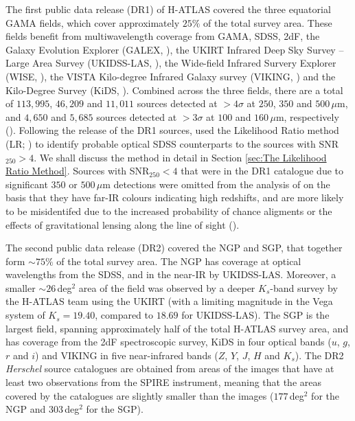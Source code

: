 The first public data release (DR1) of H-ATLAS covered the three equatorial GAMA fields, which cover approximately $25\%$ of the total survey area. These fields benefit from multiwavelength coverage from GAMA, SDSS, 2dF, the Galaxy Evolution Explorer (GALEX, \citealt{Martin_2005}), the UKIRT Infrared Deep Sky Survey -- Large Area Survey (UKIDSS-LAS, \citealt{Lawrence_2007}), the Wide-field Infrared Survery Explorer (WISE, \citealt{Wright_2010}), the VISTA Kilo-degree Infrared Galaxy survey (VIKING, \citealt{Edge_2013}) and the Kilo-Degree Survey (KiDS, \citealt{deJong_2013}). Combined across the three fields, there are a total of $113,995$, $46,209$ and $11,011$ sources detected at $> 4\sigma$ at $250$, $350$ and $500\,\mu$m, and $4,650$ and $5,685$ sources detected at $> 3\sigma$ at $100$ and $160\,\mu$m, respectively (\citealt{Valiante_2016}). Following the release of the DR1 sources, \citealt{Bourne_2016} used the Likelihood Ratio method (LR; \citealt{Sutherland_1992, Ciliegi_2003}) to identify probable optical SDSS counterparts to the sources with SNR$_{250} > 4$. We shall discuss the method in detail in Section \ref{sec:The Likelihood Ratio Method}. Sources with SNR$_{250} < 4$ that were in the DR1 catalogue due to significant $350$ or $500\,\mu$m detections were omitted from the analysis of \citealt{Bourne_2016} on the basis that they have far-IR colours indicating high redshifts, and are more likely to be misidentifed due to the increased probability of chance aligments or the effects of gravitational lensing along the line of sight \mbox{(\citealt{Negrello_2010, Pearson_2013, Bourne_2014}).}

The second public data release (DR2) covered the NGP and SGP, that together form $\sim 75\%$ of the total survey area. The NGP has coverage at optical wavelengths from the SDSS, and in the near-IR by UKIDSS-LAS. Moreover, a smaller $\sim26\,$deg$^2$ area of the field was observed by a deeper $K_s$-band survey by the H-ATLAS team using the UKIRT (with a limiting magnitude in the Vega system of $K_s = 19.40$, compared to $18.69$ for UKIDSS-LAS). The SGP is the largest field, spanning approximately half of the total H-ATLAS survey area, and has coverage from the 2dF spectroscopic survey, KiDS in four optical bands ($u$, $g$, $r$ and $i$) and VIKING in five near-infrared bands ($Z$, $Y$, $J$, $H$ and $K_s$). The DR2 \textit{Herschel} source catalogues are obtained from areas of the images that have at least two observations from the SPIRE instrument, meaning that the areas covered by the catalogues are slightly smaller than the images ($177\,$deg$^2$ for the NGP and $303\,$deg$^2$ for the SGP).

